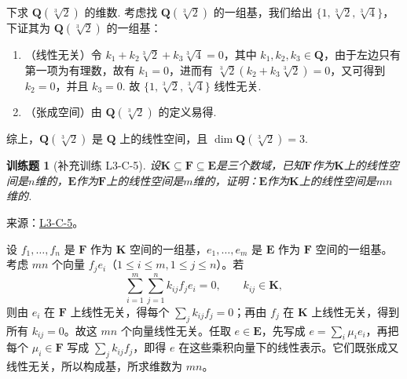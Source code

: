 \documentclass[UTF8,12pt,a4paper,fontset=fandol]{ctexart}
\newtheorem{exercise}{训练题}[section]
\begin{document}
\begin{solve}
            下求 $\mathbf{Q}(\sqrt[3]{2})$ 的维数. 考虑找 $\mathbf{Q}(\sqrt[3]{2})$ 的一组基，我们给出 $\{1, \sqrt[3]{2}, \sqrt[3]{4}\}$，下证其为 $\mathbf{Q}(\sqrt[3]{2})$ 的一组基：

            \begin{enumerate}
                \item （线性无关）令 $k_1 + k_2 \sqrt[3]{2} + k_3 \sqrt[3]{4} = 0$，其中 $k_1, k_2, k_3 \in \mathbf{Q}$，由于左边只有第一项为有理数，故有 $k_1 = 0$，进而有 $\sqrt[3]{2} (k_2 + k_3 \sqrt[3]{2}) = 0$，又可得到 $k_2 = 0$，并且 $k_3 = 0$. 故 $\{1, \sqrt[3]{2}, \sqrt[3]{4}\}$ 线性无关.

                \item （张成空间）由 $\mathbf{Q}(\sqrt[3]{2})$ 的定义易得.
            \end{enumerate}
            综上，$\mathbf{Q}(\sqrt[3]{2})$ 是 $\mathbf{Q}$ 上的线性空间，且 $\dim \mathbf{Q}(\sqrt[3]{2}) = 3$.
\end{solve}

\begin{exercise}[补充训练 L3-C-5]\label{prob:L3-C-5}
设$\mathbf{K} \subseteq \mathbf{F} \subseteq \mathbf{E}$是三个数域，已知$\mathbf{F}$作为$\mathbf{K}$上的线性空间是$n$维的，$\mathbf{E}$作为$\mathbf{F}$上的线性空间是$m$维的，证明：$\mathbf{E}$作为$\mathbf{K}$上的线性空间是$mn$维的.
\end{exercise}
\noindent 来源：\href{https://github.com/yhwu-is/Linear-Algebra-Left-Undone/blob/new/%E8%AE%B2%E4%B9%89/%E4%B8%93%E9%A2%98/3%20%E6%9C%89%E9%99%90%E7%BB%B4%E7%BA%BF%E6%80%A7%E7%A9%BA%E9%97%B4.tex}{L3-C-5}。
\begin{solve}
设 $f_1,\ldots,f_n$ 是 $\mathbf F$ 作为 $\mathbf K$ 空间的一组基，$e_1,\ldots,e_m$ 是 $\mathbf E$ 作为 $\mathbf F$ 空间的一组基。考虑 $mn$ 个向量 $f_je_i$（$1\le i\le m,1\le j\le n$）。若
\[\sum_{i=1}^m\sum_{j=1}^n k_{ij}f_je_i=0,\qquad k_{ij}\in\mathbf K,\]
则由 $e_i$ 在 $\mathbf F$ 上线性无关，得每个 $\sum_jk_{ij}f_j=0$；再由 $f_j$ 在 $\mathbf K$ 上线性无关，得到所有 $k_{ij}=0$。故这 $mn$ 个向量线性无关。任取 $e\in\mathbf E$，先写成 $e=\sum_i\mu_ie_i$，再把每个 $\mu_i\in\mathbf F$ 写成 $\sum_jk_{ij}f_j$，即得 $e$ 在这些乘积向量下的线性表示。它们既张成又线性无关，所以构成基，所求维数为 $mn$。
\end{solve}
\end{document}
